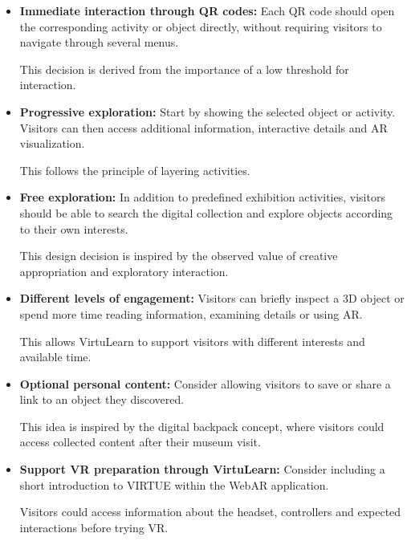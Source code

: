 \begin{itemize}

    \item \textbf{Immediate interaction through QR codes:}
    Each QR code should open the corresponding activity or
    object directly, without requiring visitors to navigate
    through several menus.

    This decision is derived from the importance of a low
    threshold for interaction.
    \cite[p.~139]{hornecker_learning_2006}

    \item \textbf{Progressive exploration:}
    Start by showing the selected object or activity.
    Visitors can then access additional information,
    interactive details and AR visualization.

    This follows the principle of layering activities.
    \cite[p.~141]{hornecker_learning_2006}

    \item \textbf{Free exploration:}
    In addition to predefined exhibition activities,
    visitors should be able to search the digital collection
    and explore objects according to their own interests.

    This design decision is inspired by the observed value
    of creative appropriation and exploratory interaction.
    \cite[pp.~140--141]{hornecker_learning_2006}

    \item \textbf{Different levels of engagement:}
    Visitors can briefly inspect a 3D object or spend more
    time reading information, examining details or using AR.

    This allows VirtuLearn to support visitors with different
    interests and available time.
    \cite[p.~141]{hornecker_learning_2006}

    \item \textbf{Optional personal content:}
    Consider allowing visitors to save or share a link to
    an object they discovered.

    This idea is inspired by the digital backpack concept,
    where visitors could access collected content after
    their museum visit.
    \cite[pp.~135--136]{hornecker_learning_2006}

    \item \textbf{Support VR preparation through VirtuLearn:}
    Consider including a short introduction to VIRTUE
    within the WebAR application.

    Visitors could access information about the headset,
    controllers and expected interactions before trying VR.


\end{itemize}
